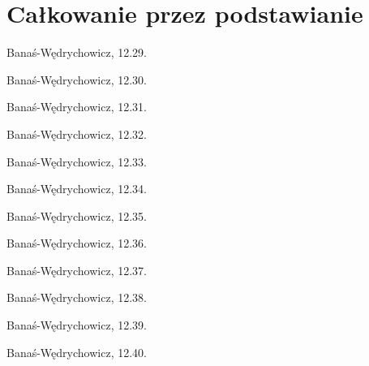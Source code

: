 \section{Całkowanie przez podstawianie}

\begin{integral}
    Banaś-Wędrychowicz, 12.29.
\end{integral}

\begin{integral}
    Banaś-Wędrychowicz, 12.30.
\end{integral}

\begin{integral}
    Banaś-Wędrychowicz, 12.31.
\end{integral}

\begin{integral}
    Banaś-Wędrychowicz, 12.32.
\end{integral}

\begin{integral}
    Banaś-Wędrychowicz, 12.33.
\end{integral}

\begin{integral}
    Banaś-Wędrychowicz, 12.34.
\end{integral}

\begin{integral}
    Banaś-Wędrychowicz, 12.35.
\end{integral}

\begin{integral}
    Banaś-Wędrychowicz, 12.36.
\end{integral}

\begin{integral}
    Banaś-Wędrychowicz, 12.37.
\end{integral}

\begin{integral}
    Banaś-Wędrychowicz, 12.38.
\end{integral}

\begin{integral}
    Banaś-Wędrychowicz, 12.39.
\end{integral}

\begin{integral}
    Banaś-Wędrychowicz, 12.40.
\end{integral}

